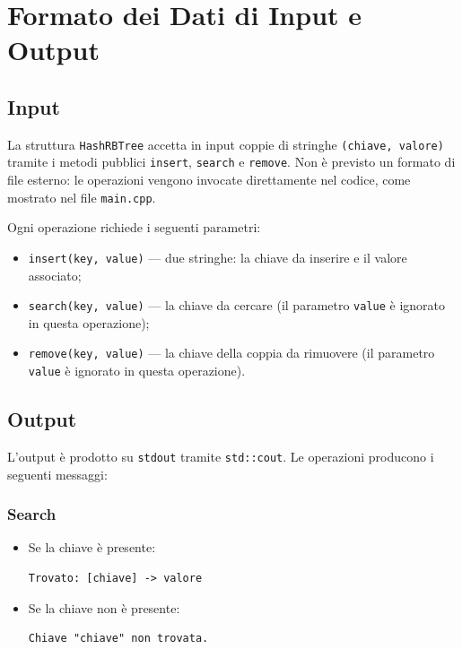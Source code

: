 \chapter{Formato dei Dati di Input e Output}

\section{Input}

La struttura \texttt{HashRBTree} accetta in input coppie di stringhe 
\texttt{(chiave, valore)} tramite i metodi pubblici \texttt{insert}, 
\texttt{search} e \texttt{remove}. Non è previsto un formato di file esterno: 
le operazioni vengono invocate direttamente nel codice, come mostrato nel 
file \texttt{main.cpp}.

Ogni operazione richiede i seguenti parametri:

\begin{itemize}
    \item \texttt{insert(key, value)} --- due stringhe: la chiave da inserire 
    e il valore associato;
    \item \texttt{search(key, value)} --- la chiave da cercare (il parametro 
    \texttt{value} è ignorato in questa operazione);
    \item \texttt{remove(key, value)} --- la chiave della coppia da rimuovere 
    (il parametro \texttt{value} è ignorato in questa operazione).
\end{itemize}

\section{Output}

L'output è prodotto su \texttt{stdout} tramite \texttt{std::cout}. 
Le operazioni producono i seguenti messaggi:

\subsection{Search}

\begin{itemize}
    \item Se la chiave è presente:
\begin{lstlisting}
Trovato: [chiave] -> valore
\end{lstlisting}
    \item Se la chiave non è presente:
\begin{lstlisting}
Chiave "chiave" non trovata.
\end{lstlisting}
\end{itemize}


